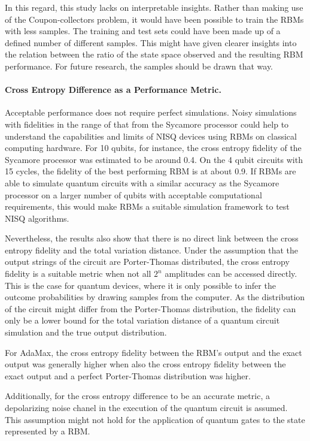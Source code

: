 In this regard, this study lacks on interpretable insights. Rather than making use of the 
Coupon-collectors problem, it would have been possible to train the RBMs with less samples. 
The training and test sets could have been made up of a defined number of different 
samples. This might have given clearer insights into the relation between the ratio of the 
state space observed and the resulting RBM performance. For future research, the samples should
be drawn that way.

\paragraph{Cross Entropy Difference as a Performance Metric.}
Acceptable performance does not require perfect simulations. Noisy simulations with 
fidelities in the range of that from the Sycamore processor could help to understand the 
capabilities and limits of NISQ devices using RBMs on classical computing hardware. For 10 qubits, for instance, the cross entropy fidelity
of the Sycamore processor was estimated to be around 0.4. On the 4 qubit circuits with 
15 cycles, the fidelity of the best performing RBM is at about 0.9. 
If RBMs are able to simulate quantum circuits with a similar accuracy as the Sycamore 
processor on a larger number of qubits with acceptable computational requirements, this 
would make RBMs a suitable simulation framework to test NISQ algorithms.

Nevertheless, the results also show that there is no direct link between the cross entropy
fidelity and the total variation distance. Under the assumption that the output strings of 
the circuit are Porter-Thomas distributed, the cross entropy fidelity is a suitable metric
when not all $2^n$ amplitudes can be accessed directly. This is the case for quantum devices, 
where it is only possible to infer the outcome probabilities by drawing samples from the computer.
As the distribution of the circuit might differ from the Porter-Thomas distribution, 
the fidelity can only be a lower bound for the total variation distance of a quantum circuit simulation
and the true output distribution.

For AdaMax, the cross entropy fidelity between the RBM's output and the exact output was 
generally higher when also the cross entropy fidelity between the exact output and a perfect Porter-Thomas 
distribution was higher. 

Additionally, for the cross entropy difference to be an accurate 
metric, a depolarizing noise chanel in the execution of the quantum circuit is assumed. This assumption 
might not hold for the application of quantum gates to the state represented by a RBM.

